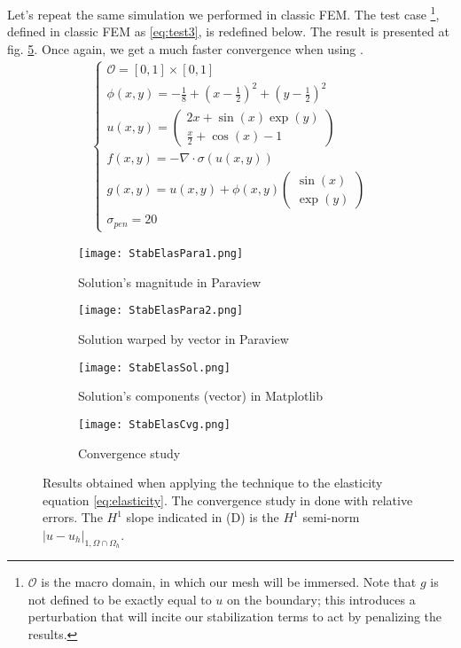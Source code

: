 Let's repeat the same simulation we performed in classic FEM. The test case \footnote{$\mathcal{O}$ is the macro domain, in which our mesh will be immersed. Note that $g$ is not defined to be exactly equal to $u$ on the boundary; this introduces a perturbation that will incite our stabilization terms to act by penalizing the results.}, defined in classic FEM as \eqref{eq:test3}, is redefined below. The result is presented at fig. \ref{fig:StabElas}. Once again, we get a much faster convergence when using \phifem.
\begin{align}
    \begin{cases}
    \mathcal{O} = [0,1]\times[0,1] \\
    \phi(x,y) = -\frac{1}{8} + \left( x-\frac{1}{2} \right)^2 + \left( y-\frac{1}{2} \right)^2 \\
    u(x,y)= \begin{pmatrix}
        2x + \sin(x)\exp(y) \\ \frac{x}{2} + \cos(x) - 1
    \end{pmatrix}  \\
    f(x,y) = -\nabla \cdot \sigma(u(x,y)) \\
    g(x,y) = u(x,y) + \phi(x,y) \begin{pmatrix}
       \sin(x) \\ \exp(y)
    \end{pmatrix} \\
    \sigma_{pen} = 20
    \end{cases}
    \label{eq:test4}
\end{align}

\begin{figure}[H]
    \centering
    \begin{subfigure}[b]{0.40\textwidth}
        \texttt{[image: StabElasPara1.png]}
        \caption{Solution's magnitude in Paraview}
        \label{fig:Para3}
    \end{subfigure}
    \begin{subfigure}[b]{0.50\textwidth}
        \texttt{[image: StabElasPara2.png]}
        \caption{Solution warped by vector in Paraview}
        \label{fig:Para3}
    \end{subfigure}
    \begin{subfigure}[b]{0.45\textwidth}
        \texttt{[image: StabElasSol.png]}
        \caption{Solution's components (vector) in Matplotlib}
        \label{fig:StabElasSol}
    \end{subfigure}
    \begin{subfigure}[b]{0.45\textwidth}
        \texttt{[image: StabElasCvg.png]}
        \caption{Convergence study}
        \label{fig:StabElasCvg}
    \end{subfigure}
       \caption{Results obtained when applying the \phifem  technique to the elasticity equation \eqref{eq:elasticity}. The convergence study in done with relative errors. The $H^1$ slope indicated in (D) is the $H^1$ semi-norm $ | u - u_h|_{1, \Omega\cap\Omega_h}$.}
       \label{fig:StabElas}
\end{figure}


